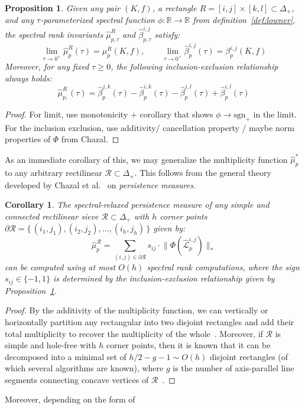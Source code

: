 \documentclass[10pt]{article}
\numberwithin{equation}{section}
\newcommand{\+}{%
	\raisebox{0.18ex}{\scaleobj{0.55}{+}}
}
\newtheorem{proposition}{Proposition}
\newtheorem{corollary}{Corollary}
\theoremstyle{definition}
\theoremstyle{definition}
\begin{document}
\begin{proposition}\label{prop:include_exclude}
Given any pair $(K, f)$, a rectangle $R = [i,j] \times [k,l] \subset \Delta_+$, and any $\tau$-parameterized spectral function $\phi: \mathbb{R} \to \mathbb{R}$ from definition~\ref{def:lowner}, the spectral rank invariants $\hat{\mu}_{p,\tau}^R$ and $\hat{\beta}_{p,\tau}^{i,j}$ satisfy: 
$$ \lim_{\tau \to 0^+ }\hat{\mu}_{p}^R(\tau) = \mu_p^R(K,f), \quad \quad \lim_{\tau \to 0^+ } \hat{\beta}_{p}^{i,j}(\tau) = \beta_{p}^{i,j}(K,f)$$
Moreover, for any fixed $\tau \geq 0$, the following inclusion-exclusion relationship always holds:
$$\hat{\mu}_{p,}^R(\tau)= \hat{\beta}_{p}^{j,k}(\tau) - \hat{\beta}_{p}^{i,k}(\tau) - \hat{\beta}_{p}^{j,l}(\tau) + \hat{\beta}_{p}^{i,l}(\tau)$$
\end{proposition}
\begin{proof}
	For limit, use monotonicity + corollary that shows $\phi \to \mathrm{sgn}_+$ in the limit. 
	For the inclusion exclusion, use additivity/ cancellation property / maybe norm properties of $\Phi$ from Chazal. 
\end{proof}
\noindent As an immediate corollary of this, we may generalize the multiplicity function $\hat{\mu}_p^\ast$ to any arbitrary rectilinear $\mathcal{R} \subset \Delta_+$. This follows from the general theory developed by Chazal et al.~\cite{chazal2016structure} on \emph{persistence measures}.
\begin{corollary}
	The spectral-relaxed \emph{persistence measure} of any simple and connected rectilinear sieve $\mathcal{R} \subset \Delta_+$ with $h$ corner points $\partial \mathcal{R} = \{ \, (i_1, j_1), (i_2, j_2), \dots,  (i_h, j_h) \, \}$ given by: 
	$$ \hat{\mu}^\mathcal{R}_p = \sum\limits_{(i,j) \in \partial \mathcal{R}} s_{ij} \cdot \lVert \Phi(\hat{\mathcal{L}}^{i,j}_p) \rVert_\ast$$
	can be computed using at most $O(h)$ spectral rank computations, where the sign $s_{ij} \in \{-1, 1\}$ is determined by the inclusion-exclusion relationship given by Proposition~\ref{prop:include_exclude}. 
\end{corollary}
\begin{proof}
	By the additivity of the multiplicity function, we can vertically or horizontally partition any rectangular into two disjoint rectangles and add their total multiplicity to recover the multiplicity of the whole~\cite{}. Moreover, if $\mathcal{R}$ is simple and hole-free with $h$ corner points, then it is known that it can be decomposed into a minimal set of $h/2-g-1 \sim O(h)$ disjoint rectangles (of which several algorithms are known), where $g$ is the number of axis-parallel line segments connecting concave vertices of $\mathcal{R}$~\cite{}.
\end{proof}
Moreover, depending on the form of 
\end{document}
